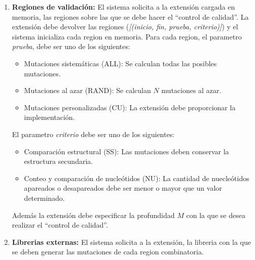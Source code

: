 \documentclass[10pt,a4paper]{article}
\begin{document}
\begin{enumerate}
    \item \textbf{Regiones de validaci\'on:}
    El sistema solicita a la extensi\'on cargada en memoria, las regiones sobre las que se debe hacer el ``control de calidad''. La extensi\'on debe devolver las regiones (\textit{[(inicio, fin, prueba, criterio)]}) y el sistema inicializa cada region en memoria. Para cada region, el parametro \textit{prueba}, debe ser uno de los siguientes:
      \begin{itemize}
        \item Mutaciones sistem\'aticas (ALL): Se calculan todas las posibles mutaciones.
	\item Mutaciones al azar (RAND): Se calculan $N$ mutaciones al azar.
	\item Mutaciones personalizadas (CU): La extensi\'on debe proporcionar la implementaci\'on.
      \end{itemize}    
    El parametro \textit{criterio} debe ser uno de los siguientes:
      \begin{itemize}
        \item Comparaci\'on estructural (SS): Las mutaciones deben conservar la estructura secundaria.
	\item Conteo y comparaci\'on de nucle\'otidos (NU): La cantidad de nuecle\'otidos apareados o desapareados debe ser menor o mayor que un valor determinado.
      \end{itemize}
    
    Adem\'as la extensi\'on debe especificar la profundidad $M$ con la que se desea realizar el ``control de calidad''.

    \item \textbf{Librerias externas:}
    El sistema solicita a la extensi\'on, la libreria con la que se deben generar las mutaciones de cada region combinatoria.
  \end{enumerate}
\end{document}
